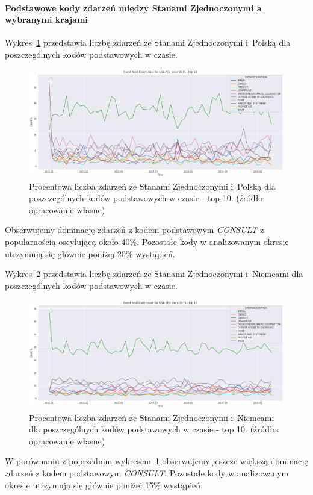 \documentclass[11pt]{report}
\begin{document}
    \paragraph{Podstawowe kody zdarzeń między Stanami Zjednoczonymi a wybranymi krajami}

    Wykres~\ref{fig:USAPOLERC} przedstawia liczbę zdarzeń ze Stanami Zjednoczonymi i~Polską dla poszczególnych kodów podstawowych w czasie.
    \begin{figure}[!htp]
        \centering
        \includegraphics[width=\linewidth]{fig/USA/USAPOLERCperc.png}
        \caption{Procentowa liczba zdarzeń ze Stanami Zjednoczonymi i~Polską dla poszczególnych kodów podstawowych w czasie - top 10. (źródło: opracowanie własne)}
        \label{fig:USAPOLERC}
    \end{figure}
    Obserwujemy dominację zdarzeń z kodem podstawowym \textit{CONSULT} z popularnością oscylującą około 40\%.
    Pozostałe kody w analizowanym okresie utrzymują się głównie poniżej 20\% wystąpień.

    Wykres~\ref{fig:USADEUERC} przedstawia liczbę zdarzeń ze Stanami Zjednoczonymi i~Niemcami dla poszczególnych kodów podstawowych w czasie.
    \begin{figure}[!htp]
        \centering
        \includegraphics[width=\linewidth]{fig/USA/USADEUERCperc.png}
        \caption{Procentowa liczba zdarzeń ze Stanami Zjednoczonymi i~Niemcami dla poszczególnych kodów podstawowych w czasie - top 10. (źródło: opracowanie własne)}
        \label{fig:USADEUERC}
    \end{figure}
    W porównaniu z poprzednim wykresem~\ref{fig:USAPOLERC} obserwujemy jeszcze większą dominację zdarzeń z kodem podstawowym \textit{CONSULT}.
    Pozostałe kody w analizowanym okresie utrzymują się głównie poniżej 15\% wystąpień.
\end{document}
